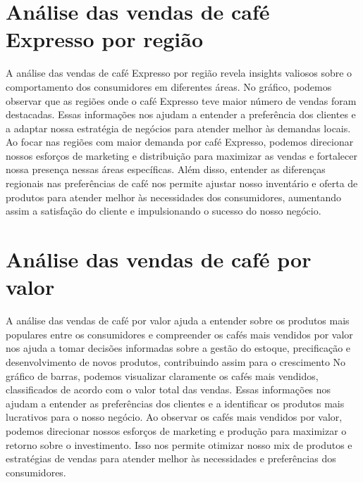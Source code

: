 \section{Análise das vendas de café Expresso por região}
A análise das vendas de café Expresso por região revela insights valiosos sobre o comportamento dos consumidores em diferentes áreas.
No gráfico, podemos observar que as regiões onde o café Expresso teve maior número de vendas foram destacadas. Essas informações nos ajudam a entender a preferência dos clientes e a adaptar nossa estratégia de negócios para atender melhor às demandas locais.
Ao focar nas regiões com maior demanda por café Expresso, podemos direcionar nossos esforços de marketing e distribuição para maximizar as vendas e fortalecer nossa presença nessas áreas específicas.
Além disso, entender as diferenças regionais nas preferências de café nos permite ajustar nosso inventário e oferta de produtos para atender melhor às necessidades dos consumidores, aumentando assim a satisfação do cliente e impulsionando o sucesso do nosso negócio.

\section{Análise das vendas de café por valor}
A análise das vendas de café por valor ajuda a entender sobre os produtos mais populares entre os consumidores e compreender os cafés mais vendidos por valor nos ajuda a tomar decisões informadas sobre a gestão do estoque, precificação e desenvolvimento de novos produtos, contribuindo assim para o crescimento
No gráfico de barras, podemos visualizar claramente os cafés mais vendidos, classificados de acordo com o valor total das vendas. Essas informações nos ajudam a entender as preferências dos clientes e a identificar os produtos mais lucrativos para o nosso negócio.
Ao observar os cafés mais vendidos por valor, podemos direcionar nossos esforços de marketing e produção para maximizar o retorno sobre o investimento. Isso nos permite otimizar nosso mix de produtos e estratégias de vendas para atender melhor às necessidades e preferências dos consumidores.

